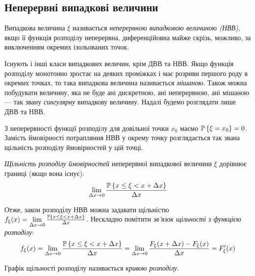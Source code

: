 \subsection{Неперервні випадкові величини}
\begin{definition}
    Випадкова величина $\xi$ називається \emph{неперервною випадковою величиною (НВВ)},
    якщо її функція розподілу неперервна, диференційовна майже скрізь, можливо, за виключенням
    окремих ізольованих точок.
\end{definition}
\begin{remark}
    Існують і інші класи випадкових величин, крім ДВВ та НВВ. Якщо функція розподілу
    монотонно зростає на деяких проміжках і має розриви першого роду в окремих точках,
    то така випадкова величина називається \emph{мішаною}. Також можна побудувати величину,
    яка не буде ані дискретною, ані неперервною, ані мішаною --- так звану \emph{сингулярну} випадкову величину.
    Надалі будемо розглядати лише ДВВ та НВВ.
\end{remark}
З неперервності функції розподілу для довільної точки $x_0$ маємо $\P\left\{\xi = x_0\right\} = 0$.
Замість ймовірності потрапляння НВВ у окрему точку розглядається так звана щільність розподілу ймовірностей у цій точці.

\begin{definition}
    \emph{Щільність розподілу ймовірностей} неперервної випадкової величини $\xi$
    дорівнює границі (якщо вона існує):
    \begin{equation}\label{eq:prob_dens}
        \lim_{\Delta x\rightarrow 0} \frac{\P\left\{x\leq \xi < x+\Delta x\right\}}{\Delta x}
    \end{equation}
\end{definition}
Отже, закон розподілу НВВ можна задавати щільністю $f_\xi(x) = \lim\limits_{\Delta x\rightarrow 0} \frac{\P\left\{x\leq \xi < x+\Delta x\right\}}{\Delta x}$.
Нескладно помітити \emph{зв'язок щільності з функцією розподілу}:
\begin{equation}\label{eq:dens_pdf}
    f_\xi(x) = \lim\limits_{\Delta x\rightarrow 0} \frac{\P\left\{x\leq \xi < x+\Delta x\right\}}{\Delta x} = 
    \lim\limits_{\Delta x\rightarrow 0} \frac{F_\xi(x+\Delta x) - F_\xi(x)}{\Delta x} = F'_\xi(x)
\end{equation}
\begin{definition}
    Графік щільності розподілу називається \emph{кривою розподілу}.
\end{definition}

